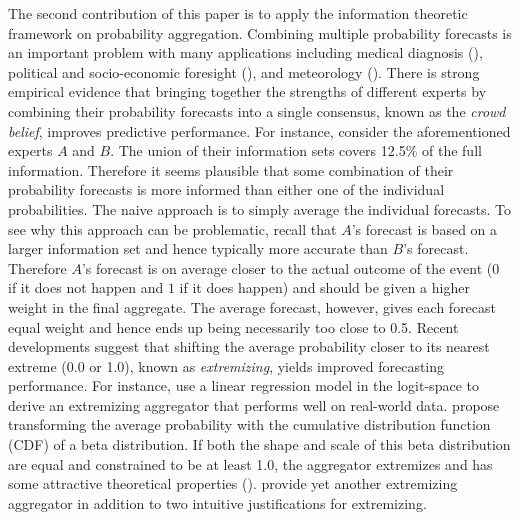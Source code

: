 \documentclass[11pt,twoside]{article}
\begin{document}
The second contribution of this paper is to apply the information theoretic framework  on probability aggregation. Combining multiple probability forecasts is an important problem with many applications including medical diagnosis (\citet{wilson1998prediction, pepe2003statistical}), political and socio-economic foresight (\citet{tetlock2005expert}), and meteorology (\citet{sanders1963subjective, vislocky1995improved, baars2005performance}). There is strong empirical evidence that bringing together the strengths of different experts by combining their probability forecasts into a single consensus, known as the \textit{crowd belief},  improves predictive performance. For instance, consider the aforementioned experts $A$ and $B$. The union of their information sets covers 12.5\% of the full information. Therefore it seems plausible that some combination of their probability forecasts is more informed than either one of the individual probabilities. The naive approach is to simply average the individual forecasts. To see why this approach can be problematic, recall that $A$'s forecast is based on a larger information set and hence typically more accurate than $B$'s forecast. Therefore $A$'s forecast is on average closer to the actual outcome of the event ($0$ if it does not happen and $1$ if it does happen) and should be given a higher weight in the final aggregate.  The average forecast, however, gives each forecast equal weight and hence ends up being necessarily too close to 0.5. Recent developments suggest that shifting the average probability closer to its nearest extreme (0.0 or 1.0), known as \textit{extremizing}, yields improved forecasting performance. For instance, \citet{satopaa} use a linear regression model in the logit-space to derive an extremizing aggregator that performs well on real-world data. \citet{Ranjan08} propose transforming the average probability with the cumulative distribution function (CDF) of a beta distribution. If both the shape and scale of this beta distribution are equal and constrained to be at least 1.0,  the aggregator extremizes and has some attractive theoretical properties (\cite{Wallsten2001}).  \citet{Baron} provide yet another extremizing aggregator in addition to two intuitive justifications for extremizing.
\end{document}
